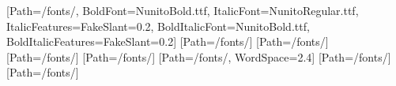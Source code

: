 \usepackage{fontspec}
\setmainfont{NunitoRegular.ttf}[Path=\bibliotecasDir/fonts/, BoldFont=NunitoBold.ttf, ItalicFont=NunitoRegular.ttf, ItalicFeatures={FakeSlant=0.2}, BoldItalicFont=NunitoBold.ttf, BoldItalicFeatures={FakeSlant=0.2}]
\newfontfamily{}[Path=\bibliotecasDir/fonts/]
\newfontfamily{}[Path=\bibliotecasDir/fonts/]
\newfontfamily{}[Path=\bibliotecasDir/fonts/]
\newfontfamily{}[Path=\bibliotecasDir/fonts/]
\newfontfamily{}[Path=\bibliotecasDir/fonts/, WordSpace=2.4]
\newfontfamily{}[Path=\bibliotecasDir/fonts/]
\newfontfamily{}[Path=\bibliotecasDir/fonts/]
